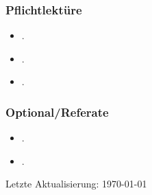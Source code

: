 \documentclass[abstract=on,parskip=full,headings=standardclasses,fontsize=11pt,paper=a4]{scrartcl}
\begin{document}
\subsubsection*{Pflichtlektüre}
\begin{itemize}
\item {}.
\item {}.
\item {}.
\end{itemize}
 
 
\subsubsection*{Optional/Referate}
\begin{itemize}
\item {}.
 \item {}.
\end{itemize}

 


\sloppy
\renewcommand*{\bibfont}{\small}

\setlength{\bibitemsep}{0.2em} %
\printbibliography

\bigskip

\begin{center}
Letzte Aktualisierung: \today
\end{center}
\end{document}
